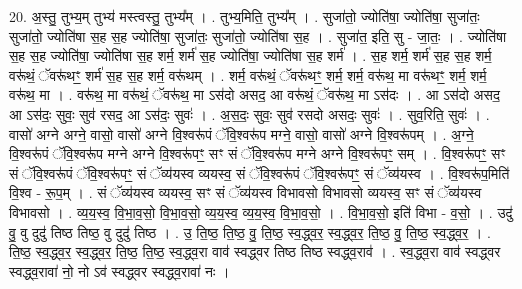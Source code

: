 \documentclass[17pt]{extarticle}
\begin{document}
20. अ॒स्तु॒ तुभ्य॒म् तुभ्य॑ मस्त्वस्तु॒ तुभ्य᳚म् । . तुभ्य॒मिति॒ तुभ्य᳚म् । . सुजा॑तो॒ ज्योति॑षा॒ ज्योति॑षा॒ सुजा॑तः॒ सुजा॑तो॒ ज्योति॑षा स॒ह स॒ह ज्योति॑षा॒ सुजा॑तः॒ सुजा॑तो॒ ज्योति॑षा स॒ह । . सुजा॑त॒ इति॒ सु - जा॒तः॒ । . ज्योति॑षा स॒ह स॒ह ज्योति॑षा॒ ज्योति॑षा स॒ह शर्म॒ शर्म॑ स॒ह ज्योति॑षा॒ ज्योति॑षा स॒ह शर्म॑ । . स॒ह शर्म॒ शर्म॑ स॒ह स॒ह शर्म॒ वरू॑थं॒ ॅवरू॑थꣳ॒॒ शर्म॑ स॒ह स॒ह शर्म॒ वरू॑थम् । . शर्म॒ वरू॑थं॒ ॅवरू॑थꣳ॒॒ शर्म॒ शर्म॒ वरू॑थ॒ मा वरू॑थꣳ॒॒ शर्म॒ शर्म॒ वरू॑थ॒ मा । . वरू॑थ॒ मा वरू॑थं॒ ॅवरू॑थ॒ मा ऽस॑दो असद॒ आ वरू॑थं॒ ॅवरू॑थ॒ मा ऽस॑दः । . आ ऽस॑दो असद॒ आ ऽस॑दः॒ सुवः॒ सुव॑ रसद॒ आ ऽस॑दः॒ सुवः॑ । . अ॒स॒दः॒ सुवः॒ सुव॑ रसदो असदः॒ सुवः॑ । . सुव॒रिति॒ सुवः॑ । . वासो॑ अग्ने अग्ने॒ वासो॒ वासो॑ अग्ने वि॒श्वरू॑पं ॅवि॒श्वरू॑प मग्ने॒ वासो॒ वासो॑ अग्ने वि॒श्वरू॑पम् । . अ॒ग्ने॒ वि॒श्वरू॑पं ॅवि॒श्वरू॑प मग्ने अग्ने वि॒श्वरू॑पꣳ॒॒ सꣳ सं ॅवि॒श्वरू॑प मग्ने अग्ने वि॒श्वरू॑पꣳ॒॒ सम् । . वि॒श्वरू॑पꣳ॒॒ सꣳ सं ॅवि॒श्वरू॑पं ॅवि॒श्वरू॑पꣳ॒॒ सं ॅव्य॑यस्व व्ययस्व॒ सं ॅवि॒श्वरू॑पं ॅवि॒श्वरू॑पꣳ॒॒ सं ॅव्य॑यस्व । . वि॒श्वरू॑प॒मिति॑ वि॒श्व - रू॒प॒म् । . सं ॅव्य॑यस्व व्ययस्व॒ सꣳ सं ॅव्य॑यस्व विभावसो विभावसो व्ययस्व॒ सꣳ सं ॅव्य॑यस्व विभावसो । . व्य॒य॒स्व॒ वि॒भा॒व॒सो॒ वि॒भा॒व॒सो॒ व्य॒य॒स्व॒ व्य॒य॒स्व॒ वि॒भा॒व॒सो॒ । . वि॒भा॒व॒सो॒ इति॑ विभा - व॒सो॒ । . उदु॑ वु॒ वु दुदु॑ तिष्ठ तिष्ठ॒ वु दुदु॑ तिष्ठ । . उ॒ ति॒ष्ठ॒ ति॒ष्ठ॒ वु॒ ति॒ष्ठ॒ स्व॒द्ध्व॒र॒ स्व॒द्ध्व॒र॒ ति॒ष्ठ॒ वु॒ ति॒ष्ठ॒ स्व॒द्ध्व॒र॒ । . ति॒ष्ठ॒ स्व॒द्ध्व॒र॒ स्व॒द्ध्व॒र॒ ति॒ष्ठ॒ ति॒ष्ठ॒ स्व॒द्ध्व॒रा वाव॑ स्वद्ध्वर तिष्ठ तिष्ठ स्वद्ध्व॒राव॑ । . स्व॒द्ध्व॒रा वाव॑ स्वद्ध्वर स्वद्ध्व॒रावा॑ नो॒ नो ऽव॑ स्वद्ध्वर स्वद्ध्व॒रावा॑ नः । \newline
\end{document}
